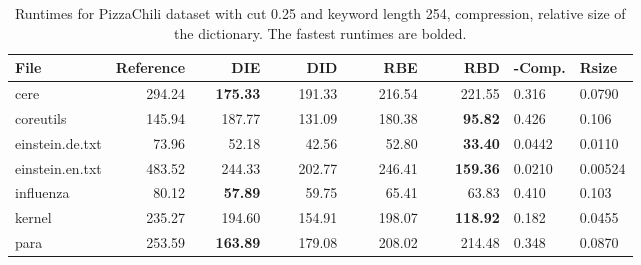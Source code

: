 \documentclass[english,twoside,censored,csm,algorithms-track-2020]{HYthesisML}
\theoremstyle{plain}
\theoremstyle{definition}
\begin{document}
\begin{center}
  \begin{table}
  \begin{tabular} {| l |r r r r r|l l|}
    \hline
    \textbf{File} & \textbf{Reference} & ~~~~\textbf{DIE} & ~~~~\textbf{DID} & ~~~~\textbf{RBE} & ~~~~\textbf{RBD} & \textbf{-Comp.} & \textbf{Rsize} \\
    \hline
    cere & 294.24 & \textbf{175.33} & 191.33 & 216.54 & 221.55            & 0.316  & 0.0790  \\
    coreutils & 145.94 & 187.77 & 131.09 & 180.38 & \textbf{95.82}        & 0.426  & 0.106   \\
    einstein.de.txt & 73.96 & 52.18 & 42.56 & 52.80 & \textbf{33.40}      & 0.0442 & 0.0110  \\
    einstein.en.txt & 483.52 & 244.33 & 202.77 & 246.41 & \textbf{159.36} & 0.0210 & 0.00524 \\
    influenza & 80.12 & \textbf{57.89} & 59.75 & 65.41 & 63.83            & 0.410  & 0.103   \\
    kernel & 235.27 & 194.60 & 154.91 & 198.07 & \textbf{118.92}          & 0.182  & 0.0455  \\
    para & 253.59 & \textbf{163.89} & 179.08 & 208.02 & 214.48            & 0.348  & 0.0870  \\
    \hline
  \end{tabular}
  \caption{Runtimes for PizzaChili dataset with cut 0.25 and keyword length 254, compression, relative size of the dictionary. The fastest runtimes are bolded.}
  \label{runtimes-25-254}
  \end{table}
\end{center}
\end{document}
